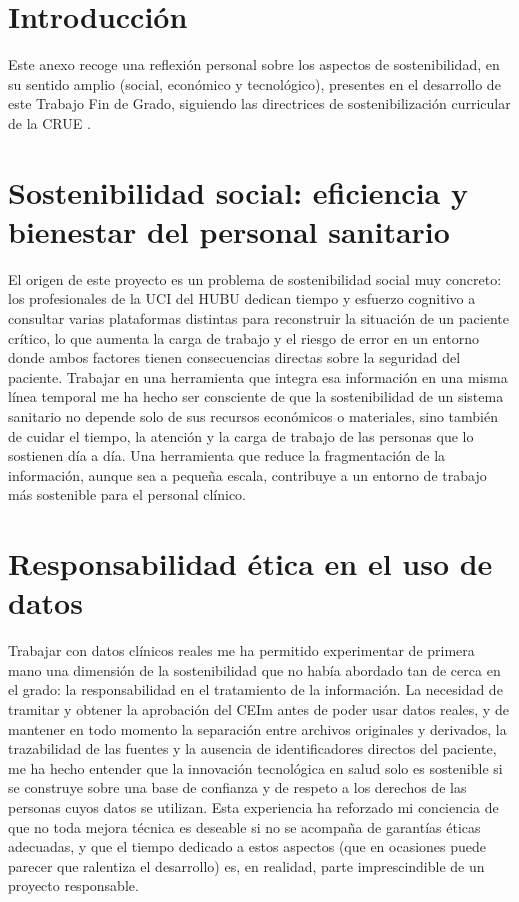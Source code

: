 \documentclass[
  spanish,
  a4paper,
  12pt,
  twoside]{memoir}
\begin{document}
\chapter{Introducción}\label{introducciuxf3n-2}

Este anexo recoge una reflexión personal sobre los aspectos de
sostenibilidad, en su sentido amplio (social, económico y tecnológico),
presentes en el desarrollo de este Trabajo Fin de Grado, siguiendo las
directrices de sostenibilización curricular de la CRUE \citep{CRUE2012}.

\chapter{Sostenibilidad social: eficiencia y bienestar del personal
sanitario}\label{sostenibilidad-social-eficiencia-y-bienestar-del-personal-sanitario}

El origen de este proyecto es un problema de sostenibilidad social muy
concreto: los profesionales de la UCI del HUBU dedican tiempo y esfuerzo
cognitivo a consultar varias plataformas distintas para reconstruir la
situación de un paciente crítico, lo que aumenta la carga de trabajo y
el riesgo de error en un entorno donde ambos factores tienen
consecuencias directas sobre la seguridad del paciente. Trabajar en una
herramienta que integra esa información en una misma línea temporal me
ha hecho ser consciente de que la sostenibilidad de un sistema sanitario
no depende solo de sus recursos económicos o materiales, sino también de
cuidar el tiempo, la atención y la carga de trabajo de las personas que
lo sostienen día a día. Una herramienta que reduce la fragmentación de
la información, aunque sea a pequeña escala, contribuye a un entorno de
trabajo más sostenible para el personal clínico.

\chapter{Responsabilidad ética en el uso de
datos}\label{responsabilidad-uxe9tica-en-el-uso-de-datos}

Trabajar con datos clínicos reales me ha permitido experimentar de
primera mano una dimensión de la sostenibilidad que no había abordado
tan de cerca en el grado: la responsabilidad en el tratamiento de la
información. La necesidad de tramitar y obtener la aprobación del CEIm
antes de poder usar datos reales, y de mantener en todo momento la
separación entre archivos originales y derivados, la trazabilidad de las
fuentes y la ausencia de identificadores directos del paciente, me ha
hecho entender que la innovación tecnológica en salud solo es sostenible
si se construye sobre una base de confianza y de respeto a los derechos
de las personas cuyos datos se utilizan. Esta experiencia ha reforzado
mi conciencia de que no toda mejora técnica es deseable si no se
acompaña de garantías éticas adecuadas, y que el tiempo dedicado a estos
aspectos (que en ocasiones puede parecer que ralentiza el desarrollo)
es, en realidad, parte imprescindible de un proyecto responsable.
\end{document}
